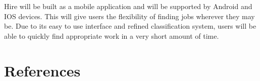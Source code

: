 \documentclass[11pt]{article}
\begin{document}
Hire will be built as a mobile application and will be supported by Android and IOS devices. This will give users the flexibility of finding jobs wherever they may be. Due to its easy to use interface and refined classification system, users will be able to quickly find appropriate work in a very short amount of time.

 
    \section{References} 
    
    

    
    
    \pagebreak
%  


%
%
%
\end{document}

